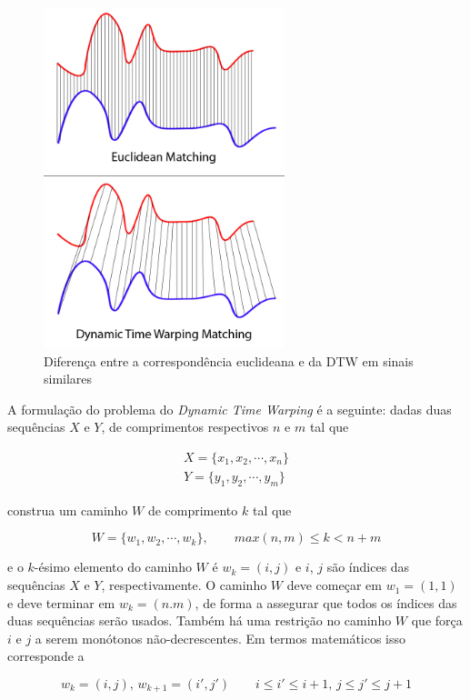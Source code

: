 \begin{figure}[htb]
\centering
\includegraphics[width=7cm]{figuras/Euclidean_vs_DTW.jpg}
\caption{Diferença entre a correspondência euclideana e da DTW em sinais similares \citep{dtwmatching}}
\label{fig:euclidean-vs-dtw-matching}
\end{figure}

A formulação do problema \citep{salvador2007toward} do \textit{Dynamic Time Warping} é a seguinte: dadas duas sequências $X$ e $Y$, de comprimentos respectivos $n$ e $m$ tal que 

\begin{align*}
    X = \{x_1, x_2, \cdots, x_n\} \\
    Y = \{y_1, y_2, \cdots, y_m\}
\end{align*}

construa um caminho $W$ de comprimento $k$ tal que

\begin{equation*}
    W = \{w_1, w_2, \cdots, w_k\}, \qquad max(n, m) \leq k < n + m
\end{equation*}

e o $k$-ésimo elemento do caminho $W$ é $w_k = (i, j)$ e $i$, $j$ são índices das sequências $X$ e $Y$, respectivamente. O caminho $W$ deve começar em $w_1 = (1, 1)$ e deve terminar em $w_k = (n. m)$, de forma a assegurar que todos os índices das duas sequências serão usados. Também há uma restrição no caminho $W$ que força $i$ e $j$ a serem monótonos não-decrescentes. Em termos matemáticos isso corresponde a

\begin{equation*}
    w_k = (i, j),\, w_{k + 1} = (i', j') \qquad i \leq i' \leq i + 1,\, j\leq j' \leq j + 1
\end{equation*}

